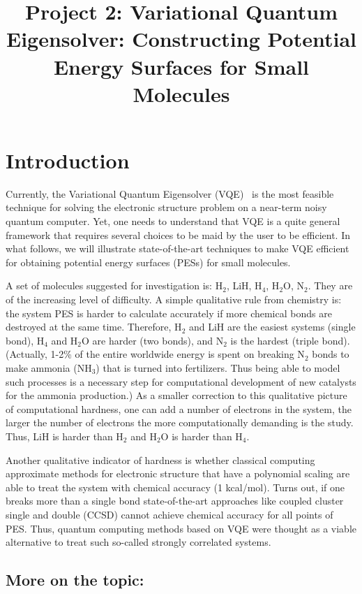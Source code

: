 \documentclass[12pt]{article}
\title{Project 2: Variational Quantum Eigensolver: Constructing Potential Energy Surfaces for Small Molecules }
\date{}
\begin{document}
\maketitle

\section*{Introduction}

Currently, the Variational Quantum Eigensolver (VQE)~\cite{Peruzzo2014} 
is the most feasible technique for solving the electronic structure problem on a near-term 
noisy quantum computer. Yet, one needs to understand that VQE is a quite general framework that requires several choices to be maid by the user 
to be efficient. In what follows, we will illustrate state-of-the-art techniques to make VQE efficient for obtaining potential energy surfaces (PESs) 
for small molecules. 

A set of molecules suggested for investigation is: H$_2$, LiH, H$_4$, H$_2$O, N$_2$. They are of the increasing level of difficulty. A simple 
qualitative rule from chemistry is: the system PES is harder to calculate accurately if more chemical bonds are destroyed at the same time. 
Therefore, H$_2$ and LiH are the easiest systems (single bond), H$_4$ and H$_2$O are harder (two bonds), and N$_2$ is the hardest (triple bond).
(Actually, 1-2\% of the entire worldwide energy is spent on breaking N$_2$ bonds to make ammonia (NH$_3$) that is turned into fertilizers. 
Thus being able to model such processes is a necessary step for computational development of new catalysts for the ammonia production.)     
As a smaller correction to this qualitative picture of computational hardness, one can add a number of electrons in the system, the larger the number 
of electrons the more computationally demanding is the study. Thus, LiH is harder than H$_2$ and H$_2$O is harder than H$_4$. 

Another qualitative indicator of hardness is whether classical computing approximate methods for electronic structure that have a polynomial 
scaling are able to treat the system with chemical accuracy (1 kcal/mol). Turns out, if one breaks more than a single bond state-of-the-art approaches 
like coupled cluster single and double (CCSD) cannot achieve chemical accuracy for all points of PES. Thus, quantum computing methods based 
on VQE were thought as a viable alternative to treat such so-called strongly correlated systems.   

\subsection*{More on the topic:}
\end{document}
